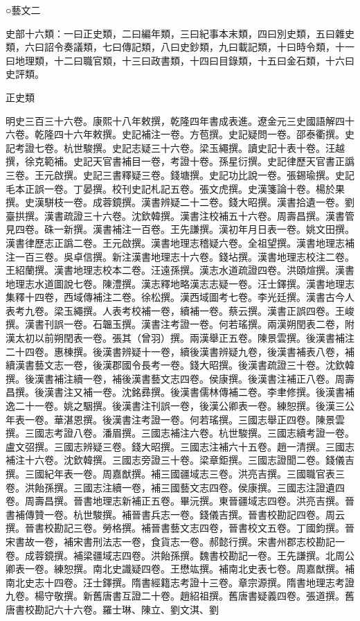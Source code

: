 
\begin{pinyinscope}
○藝文二

史部十六類：一曰正史類，二曰編年類，三曰紀事本末類，四曰別史類，五曰雜史類，六曰詔令奏議類，七曰傳記類，八曰史鈔類，九曰載記類，十曰時令類，十一曰地理類，十二曰職官類，十三曰政書類，十四曰目錄類，十五曰金石類，十六曰史評類。

正史類

明史三百三十六卷。康熙十八年敕撰，乾隆四年書成表進。遼金元三史國語解四十六卷。乾隆四十六年敕撰。史記補注一卷。方苞撰。史記疑問一卷。邵泰衢撰。史記考證七卷。杭世駿撰。史記志疑三十六卷。梁玉繩撰。讀史記十表十卷。汪越撰，徐克範補。史記天官書補目一卷，考證十卷。孫星衍撰。史記律歷天官書正譌三卷。王元啟撰。史記三書釋疑三卷。錢塘撰。史記功比說一卷。張錫瑜撰。史記毛本正誤一卷。丁晏撰。校刊史記札記五卷。張文虎撰。史漢箋論十卷。楊於果撰。史漢駢枝一卷。成蓉鏡撰。漢書辨疑二十二卷。錢大昭撰。漢書拾遺一卷。劉臺拱撰。漢書疏證三十六卷。沈欽韓撰。漢書注校補五十六卷。周壽昌撰。漢書管見四卷。硃一新撰。漢書補注一百卷。王先謙撰。漢初年月日表一卷。姚文田撰。漢書律歷志正譌二卷。王元啟撰。漢書地理志稽疑六卷。全祖望撰。漢書地理志補注一百三卷。吳卓信撰。新注漢書地理志十六卷。錢坫撰。漢書地理志校注二卷。王紹蘭撰。漢書地理志校本二卷。汪遠孫撰。漢志水道疏證四卷。洪頤煊撰。漢書地理志水道圖說七卷。陳澧撰。漢志釋地略漢志志疑一卷。汪士鐸撰。漢書地理志集釋十四卷，西域傳補注二卷。徐松撰。漢西域圖考七卷。李光廷撰。漢書古今人表考九卷。梁玉繩撰。人表考校補一卷，續補一卷。蔡云撰。漢書正誤四卷。王峻撰。漢書刊誤一卷。石韞玉撰。漢書注考證一卷。何若瑤撰。兩漢朔閏表二卷，附漢太初以前朔閏表一卷。張其（曾羽）撰。兩漢舉正五卷。陳景雲撰。後漢書補注二十四卷。惠棟撰。後漢書辨疑十一卷，續後漢書辨疑九卷，後漢書補表八卷，補續漢書藝文志一卷，後漢郡國令長考一卷。錢大昭撰。後漢書疏證三十卷。沈欽韓撰。後漢書補注續一卷，補後漢書藝文志四卷。侯康撰。後漢書注補正八卷。周壽昌撰。後漢書注又補一卷。沈銘彞撰。後漢書儒林傳補二卷。李聿修撰。後漢書補逸二十一卷。姚之駰撰。後漢書注刊誤一卷，後漢公卿表一卷。練恕撰。後漢三公年表一卷。華湛恩撰。後漢書注考證一卷。何若瑤撰。三國志舉正四卷。陳景雲撰。三國志考證八卷。潘眉撰。三國志補注六卷。杭世駿撰。三國志續考證一卷。盧文弨撰。三國志辨疑三卷。錢大昭撰。三國志注補六十五卷。趙一清撰。三國志補注十六卷。沈欽韓撰。三國志旁證三十卷。梁章鉅撰。三國志證聞二卷。錢儀吉撰。三國紀年表一卷。周嘉猷撰。補三國疆域志三卷。洪亮吉撰。三國職官表三卷。洪飴孫撰。三國志注續一卷，補三國藝文志四卷。侯康撰。三國志注證遺四卷。周壽昌撰。晉書地理志新補正五卷。畢沅撰。東晉疆域志四卷。洪亮吉撰。晉書補傳贊一卷。杭世駿撰。補晉書兵志一卷。錢儀吉撰。晉書校勘記四卷。周云撰。晉書校勘記三卷。勞格撰。補晉書藝文志四卷，晉書校文五卷。丁國鈞撰。晉宋書故一卷，補宋書刑法志一卷，食貨志一卷。郝懿行撰。宋書州郡志校勘記一卷。成蓉鏡撰。補梁疆域志四卷。洪飴孫撰。魏書校勘記一卷。王先謙撰。北周公卿表一卷。練恕撰。南北史識疑四卷。王懋竑撰。補南北史表七卷。周嘉猷撰。補南北史志十四卷。汪士鐸撰。隋書經籍志考證十三卷。章宗源撰。隋書地理志考證九卷。楊守敬撰。新舊唐書互證二十卷。趙紹祖撰。舊唐書疑義四卷。張道撰。舊唐書校勘記六十六卷。羅士琳、陳立、劉文淇、劉
\end{pinyinscope}
